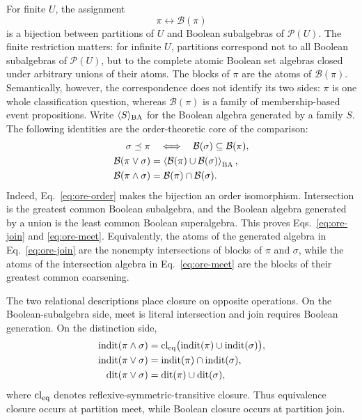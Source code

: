 \documentclass[aps,pra,reprint,nofootinbib]{revtex4-2}
\newcommand{\Pow}{\mathcal{P}}
\newcommand{\BA}{\mathcal{B}}
\newcommand{\dit}{\operatorname{dit}}
\newcommand{\indit}{\operatorname{indit}}
\begin{document}
For finite $U$, the assignment
\begin{equation}
  \pi\longleftrightarrow\BA(\pi)
  \label{eq:ore-rota-map}
\end{equation}
  is a bijection between partitions of $U$ and Boolean subalgebras of
  $\Pow(U)$.  The finite restriction matters: for infinite $U$, partitions
  correspond not to all Boolean subalgebras of $\Pow(U)$, but to the complete
  atomic Boolean set algebras closed under arbitrary unions of their atoms.  The blocks of
  $\pi$ are the atoms of $\BA(\pi)$.  Semantically,
however, the correspondence does not identify its two sides: $\pi$ is one
whole classification question, whereas $\BA(\pi)$ is a family of
  membership-based event propositions.  Write
 $\langle S\rangle_{\rm BA}$ for the Boolean algebra generated by a family
 $S$.  The following identities are the order-theoretic core of the
 comparison:
\begin{align}
  \sigma\preceq\pi
  &\quad\Longleftrightarrow\quad
  \BA(\sigma)\subseteq\BA(\pi),
  \label{eq:ore-order}\\
  \BA(\pi\vee\sigma)
  &=\left\langle\BA(\pi)\cup\BA(\sigma)\right\rangle_{\rm BA},
  \label{eq:ore-join}\\
  \BA(\pi\wedge\sigma)
  &=\BA(\pi)\cap\BA(\sigma).
  \label{eq:ore-meet}
\end{align}
Indeed, Eq.~\eqref{eq:ore-order} makes the bijection an order isomorphism.
Intersection is the greatest common Boolean subalgebra, and the Boolean
algebra generated by a union is the least common Boolean superalgebra.  This
proves Eqs.~\eqref{eq:ore-join} and \eqref{eq:ore-meet}.  Equivalently, the
atoms of the generated algebra in Eq.~\eqref{eq:ore-join} are the nonempty
intersections of blocks of $\pi$ and $\sigma$, while the atoms of the
intersection algebra in Eq.~\eqref{eq:ore-meet} are the blocks of their
greatest common coarsening.

The two relational descriptions place closure on opposite operations.  On
the Boolean-subalgebra side, meet is literal intersection and join requires
Boolean generation.  On the distinction side,
\begin{align}
  \indit(\pi\wedge\sigma)
  &=\operatorname{cl}_{\rm eq}
    \bigl(\indit(\pi)\cup\indit(\sigma)\bigr),
  \label{eq:meet-equivalence-closure}\\
  \indit(\pi\vee\sigma)
  &=\indit(\pi)\cap\indit(\sigma),\nonumber\\
  \dit(\pi\vee\sigma)
  &=\dit(\pi)\cup\dit(\sigma),
  \label{eq:join-dit-union}
\end{align}
where $\operatorname{cl}_{\rm eq}$ denotes reflexive-symmetric-transitive
closure.  Thus equivalence closure occurs at partition meet, while Boolean
closure occurs at partition join.
\end{document}
